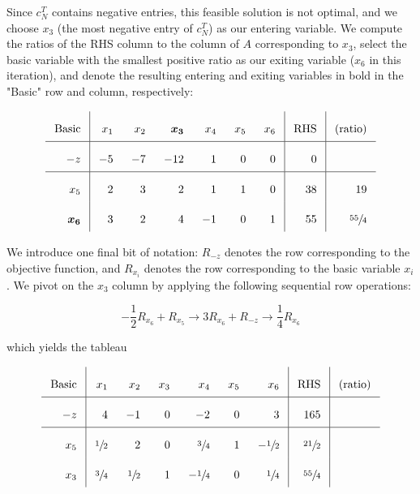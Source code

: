 \begin{solution}
  Since $c_N^T$ contains negative entries, this feasible solution is not optimal, and we choose $x_3$ (the most negative
  entry of $c_N^T$) as our entering variable. We compute the ratios of the RHS column to the column of $A$ corresponding
  to $x_3$, select the basic variable with the smallest positive ratio as our exiting variable ($x_6$ in this 
  iteration), and denote the resulting entering and exiting variables in bold in the "Basic" row and column, 
  respectively:
  
  \[\arraycolsep=8pt\def\arraystretch{2.2}
  \begin{array}{r|rrrrrr|r|r}
    \text{Basic} &  x_1  &  x_2  &  \bm{x_3}  &  x_4  & x_5 & x_6  & \text{RHS} & \text{(ratio)}  \\ \hline
    -z           &  -5   &  -7   &  -12       &   1   &  0  &  0   &   0        &                 \\ \hline
    x_5          &   2   &   3   &   2        &   1   &  1  &  0   &  38        & 19              \\
    \bm{x_6}     &   3   &   2   &   4        &  -1   &  0  &  1   &  55        & \sfrac{55}{4}              
  \end{array}
  \]

  We introduce one final bit of notation: $R_{-z}$ denotes the row corresponding to the objective function, and $R_{x_i}$
  denotes the row corresponding to the basic variable $x_i$. We pivot on the $x_3$ column by applying the following 
  sequential row operations:
  
  $$
  -\frac{1}{2} R_{x_6} + R_{x_5}  \longrightarrow 3 R_{x_6} + R_{-z} \longrightarrow \frac{1}{4} R_{x_6}
  $$

  which yields the tableau
  
  \[\arraycolsep=8pt\def\arraystretch{2.2}
  \begin{array}{r|rrrrrr|r|r}
    \text{Basic} &  x_1            &  x_2            &  x_3  &  x_4            &  x_5  &  x_6            & \text{RHS}     & \text{(ratio)}  \\ \hline
    -z           &   4             &  -1             &  0    &  -2             &   0   &   3             &  165           &                 \\ \hline
    x_5          &   \sfrac{1}{2}  &   2             &  0    &   \sfrac{3}{4}  &   1   &  -\sfrac{1}{2}  &  \sfrac{21}{2} &                 \\
    x_3          &   \sfrac{3}{4}  &   \sfrac{1}{2}  &  1    &  -\sfrac{1}{4}  &   0   &   \sfrac{1}{4}  &  \sfrac{55}{4} &                            
  \end{array}
  \]


\end{solution}
